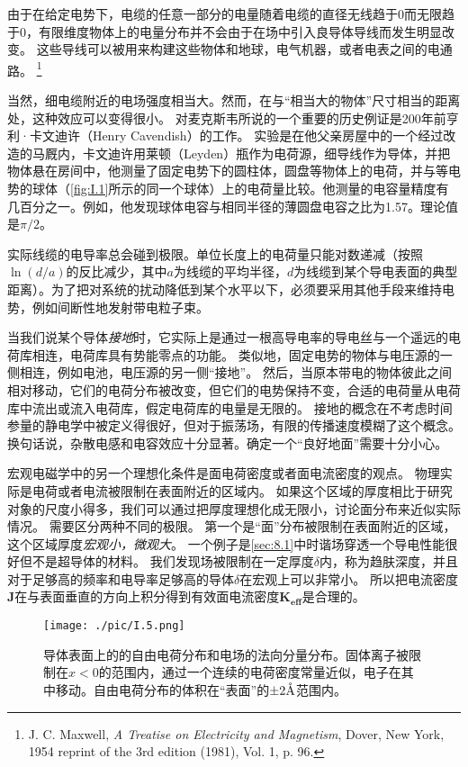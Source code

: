 \documentclass[12pt]{book}
\def\AA{\mathring{\rm A}}
\numberwithin{equation}{chapter}
\numberwithin{figure}{chapter}
\numberwithin{footnote}{page}
\begin{document}
由于在给定电势下，电缆的任意一部分的电量随着电缆的直径无线趋于0而无限趋于0，有限维度物体上的电量分布并不会由于在场中引入良导体导线而发生明显改变。
这些导线可以被用来构建这些物体和地球，电气机器，或者电表之间的电通路。
\footnote{J. C. Maxwell, \textit{A Treatise on Electricity and Magnetism}, Dover, New York, 1954 reprint of the 3rd edition (1981), Vol. 1, p. 96.}

当然，细电缆附近的电场强度相当大。然而，在与“相当大的物体”尺寸相当的距离处，这种效应可以变得很小。
对麦克斯韦所说的一个重要的历史例证是200年前亨利·卡文迪许（Henry Cavendish）的工作。
实验是在他父亲房屋中的一个经过改造的马厩内，卡文迪许用莱顿（Leyden）瓶作为电荷源，细导线作为导体，并把物体悬在房间中，他测量了固定电势下的圆柱体，圆盘等物体上的电荷，并与等电势的球体（\autoref{fig:I.1}所示的同一个球体）上的电荷量比较。他测量的电容量精度有几百分之一。例如，他发现球体电容与相同半径的薄圆盘电容之比为1.57。理论值是$\pi/2$。

实际线缆的电导率总会碰到极限。单位长度上的电荷量只能对数递减（按照$\ln(d/a)$的反比减少，其中$a$为线缆的平均半径，$d$为线缆到某个导电表面的典型距离）。为了把对系统的扰动降低到某个水平以下，必须要采用其他手段来维持电势，例如间断性地发射带电粒子束。

当我们说某个导体\textit{接地}时，它实际上是通过一根高导电率的导电丝与一个遥远的电荷库相连，电荷库具有势能零点的功能。
类似地，固定电势的物体与电压源的一侧相连，例如电池，电压源的另一侧“接地”。
然后，当原本带电的物体彼此之间相对移动，它们的电荷分布被改变，但它们的电势保持不变，合适的电荷量从电荷库中流出或流入电荷库，假定电荷库的电量是无限的。
接地的概念在不考虑时间参量的静电学中被定义得很好，但对于振荡场，有限的传播速度模糊了这个概念。换句话说，杂散电感和电容效应十分显著。确定一个“良好地面”需要十分小心。

宏观电磁学中的另一个理想化条件是面电荷密度或者面电流密度的观点。
物理实际是电荷或者电流被限制在表面附近的区域内。
如果这个区域的厚度相比于研究对象的尺度小得多，我们可以通过把厚度理想化成无限小，讨论面分布来近似实际情况。
需要区分两种不同的极限。
第一个是“面”分布被限制在表面附近的区域，这个区域厚度\textit{宏观小，微观大}。
一个例子是\autoref{sec:8.1}中时谐场穿透一个导电性能很好但不是超导体的材料。
我们发现场被限制在一定厚度$\delta$内，称为趋肤深度，并且对于足够高的频率和电导率足够高的导体$\delta$在宏观上可以非常小。
所以把电流密度$\mathbf{J}$在与表面垂直的方向上积分得到有效面电流密度$\mathbf{K_{eff}}$是合理的。

\begin{figure}[!ht]
    \centering
    \texttt{[image: ./pic/I.5.png]}
    \captionsetup{justification=raggedright, singlelinecheck=false}
    \caption{导体表面上的的自由电荷分布和电场的法向分量分布。固体离子被限制在$x<0$的范围内，通过一个连续的电荷密度常量近似，电子在其中移动。自由电荷分布的体积在“表面”的$\pm 2\AA$范围内。}
    \label{fig:I.5}
\end{figure}
\end{document}
